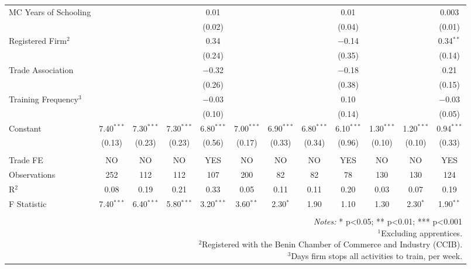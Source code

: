 \documentclass[
  11pt,
a4paper
]{report}
\begin{document}
\begin{table}[H]
\begin{tabular}{@{\extracolsep{-8pt}}lccccccccccc}
  MC Years of Schooling &  &  &  & 0.01 &  &  &  & 0.01 &  &  & 0.003 \\ 
  &  &  &  & (0.02) &  &  &  & (0.04) &  &  & (0.01) \\ 
  Registered Firm$^2$ &  &  &  & 0.34 &  &  &  & $-$0.14 &  &  & 0.34$^{**}$ \\ 
  &  &  &  & (0.24) &  &  &  & (0.35) &  &  & (0.14) \\ 
  Trade Association &  &  &  & $-$0.32 &  &  &  & $-$0.18 &  &  & 0.21 \\ 
  &  &  &  & (0.26) &  &  &  & (0.38) &  &  & (0.15) \\ 
  Training Frequency$^3$ &  &  &  & $-$0.03 &  &  &  & 0.10 &  &  & $-$0.03 \\ 
  &  &  &  & (0.10) &  &  &  & (0.14) &  &  & (0.05) \\ 
  Constant & 7.40$^{***}$ & 7.30$^{***}$ & 7.30$^{***}$ & 6.80$^{***}$ & 7.00$^{***}$ & 6.90$^{***}$ & 6.80$^{***}$ & 6.10$^{***}$ & 1.30$^{***}$ & 1.20$^{***}$ & 0.94$^{***}$ \\ 
  & (0.13) & (0.23) & (0.23) & (0.56) & (0.17) & (0.33) & (0.34) & (0.96) & (0.10) & (0.10) & (0.33) \\ 
 \hline \\[-1.8ex] 
Trade FE & NO & NO & NO & YES & NO & NO & NO & YES & NO & NO & YES \\ 
Observations & 252 & 112 & 112 & 107 & 200 & 82 & 82 & 78 & 130 & 130 & 124 \\ 
R$^{2}$ & 0.08 & 0.19 & 0.21 & 0.33 & 0.05 & 0.11 & 0.11 & 0.20 & 0.03 & 0.07 & 0.19 \\ 
F Statistic & 7.40$^{***}$ & 6.40$^{***}$ & 5.80$^{***}$ & 3.20$^{***}$ & 3.60$^{**}$ & 2.30$^{*}$ & 1.90 & 1.10 & 1.30 & 2.30$^{*}$ & 1.90$^{**}$ \\ 
\hline 
\hline \\[-1.8ex] 
\multicolumn{12}{r}{\parbox[t]{\textwidth}{\textit{Notes:} * p<0.05; ** p<0.01; *** p<0.001 \\ $^1$Excluding apprentices. \\ $^2$Registered with the Benin Chamber of Commerce and Industry (CCIB). \\ $^3$Days firm stops all activities to train, per week.}} \\ 
\end{tabular} 
\end{table}
\end{document}
